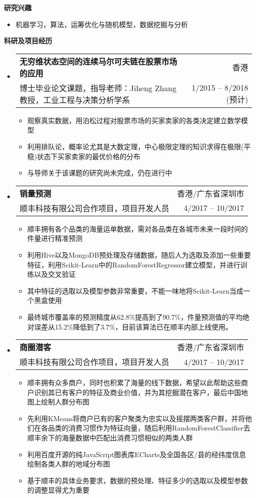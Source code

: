 \documentclass[letterpaper,9pt]{ctexart}
\makeatletter
\newcommand{\resitem}[1]{\item #1 \vspace{-2pt}}
\newcommand{\resheading}[1]{{\large \colorbox{mygrey}{\begin{minipage}{\textwidth}{\textbf{#1 \vphantom{p\^{E}}}}\end{minipage}}}}
\newcommand{\ressubheading}[4]{
\begin{tabular*}{6.5in}{l@{\extracolsep{\fill}}r}
    \textbf{#1} & #2 \\
    #3 & #4 \\
\end{tabular*}\vspace{-6pt}}
\makeatother
\begin{document}
\resheading{研究兴趣}
\begin{itemize}
\item 机器学习，算法，运筹优化与随机模型，数据挖掘与分析
\end{itemize}


\resheading{科研及项目经历}
\begin{itemize}
\item
\ressubheading{无穷维状态空间的连续马尔可夫链在股票市场的应用}{香港}{博士毕业论文课题，指导老师：Jiheng Zhang教授，工业工程与决策分析学系}{1/2015 -- 8/2018 (预计)}
\begin{itemize}
\resitem{观察真实数据，用泊松过程对股票市场的买家卖家的各类决定建立数学模型}
\resitem{利用排队论，概率论尤其是大数定理，中心极限定理的知识求得在极限(平稳)状态下买家卖家的最优价格的分布}
\resitem{与导师关于该课题的研究尚未完成，仍在进行中}
\end{itemize}


\item 
\ressubheading{销量预测}{香港/广东省深圳市}{顺丰科技有限公司合作项目，项目开发人员}{4/2017 -- 10/2017}
\begin{itemize}
\resitem{顺丰拥有各个品类的海量运单数据，需对各品类在各城市未来一段时间的件量进行精准预测}
\resitem{利用Hive以及MongoDB预处理及存储数据，随后人为选取及添加一些重要特征，利用Scikit-Learn中的RandomForestRegressor建立模型，并进行训练以及交叉验证}
\resitem{其中特征的选取以及模型参数非常重要，不能一味地将Scikit-Learn当成一个黑盒使用}
\resitem{最终城市覆盖率的预测精度从62.8\%提高到了90.7\%，件量预测值的平均绝对误差从15.2\%降低到了3.7\%，目前该算法已在顺丰内部上线使用。}
\end{itemize}


\item 
\ressubheading{商圈潜客}{香港/广东省深圳市}{顺丰科技有限公司合作项目，项目开发人员}{4/2017 -- 10/2017}
\begin{itemize}
\resitem{顺丰拥有众多商户，同时也积累了海量的线下数据，希望以此帮助这些商户识别其已有客户的特征及商业价值，并为其挖掘潜在客户，最后中国地图上绘制人群分布图}
\resitem{先利用KMeans将商户已有的客户聚类为忠实以及摇摆两类客户群，并将他们在各品类的消费习惯作为特征向量，随后利用RandomForestClassifier去顺丰余下的海量数据中匹配出消费习惯相似的两类人群}
\resitem{利用百度开源的纯JavaScript图表库ECharts及全国各区/县的经纬度信息绘制各类人群的地域分布图}
\resitem{基于顺丰的具体业务要求，数据的预处理、特征多少的选取以及模型参数的调整显得尤为重要}
\end{itemize}



\end{itemize}
\end{document}
